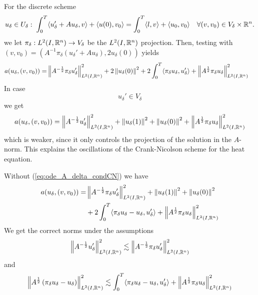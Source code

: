 \documentclass[english,12pt,a4paper]{article}
\begin{document}
%
For the discrete scheme
%
\begin{equation}\label{eq:ode_A_delta}
u_{\delta}\in U_{\delta}:\; \int_0^T \langle u_{\delta}' +Au_{\delta},v\rangle + \langle u(0),v_0\rangle = \int_0^T \langle l,v\rangle + \langle u_0,v_0\rangle \quad\forall (v,v_0)\in V_{\delta}\times\mathbb R^n.
\end{equation}
%
we let $\pi_{\delta}:L^2(I,\mathbb R^n)\to V_{\delta}$ be the $L^2(I,\mathbb R^n)$ projection. Then, testing with $(v,v_0)=(A^{-1}\pi_{\delta}(u_{\delta}'+ Au_{\delta}),2u_{\delta}(0))$ yields
%
\begin{align*}
a(u_{\delta}, (v,v_0)) =& \left\|A^{-\frac12}\pi_{\delta}u_{\delta}'\right\|^2_{L^2(I,\mathbb R^n)} + 2\left\|u_{\delta}(0)\right\|^2 + 2\int_0^T \langle\pi_{\delta}u_{\delta},u_{\delta}'\rangle + \left\|A^{\frac12}\pi_{\delta}u_{\delta}\right\|^2_{L^2(I,\mathbb R^n)}
\end{align*}
%
In case
%
\begin{equation}\label{eq:ode_A_delta_condCN}
u_{\delta}' \in V_{\delta}
\end{equation}
%
we get 
%
\begin{align*}
a(u_{\delta}, (v,v_0)) = \left\|A^{-\frac12}u_{\delta}'\right\|^2_{L^2(I,\mathbb R^n)} + \left\|u_{\delta}(1)\right\|^2 + \left\|u_{\delta}(0)\right\|^2  + \left\|A^{\frac12}\pi_{\delta}u_{\delta}\right\|^2_{L^2(I,\mathbb R^n)}
\end{align*}
%
which is weaker, since it only controls the projection of the solution in the $A$-norm. This explains the oscillations of the Crank-Nicolson scheme for the heat equation.


Without (\ref{eq:ode_A_delta_condCN}) we have
%
\begin{align*}
a(u_{\delta}, (v,v_0)) =& \left\|A^{-\frac12}\pi_{\delta}u_{\delta}'\right\|^2_{L^2(I,\mathbb R^n)} + \left\|u_{\delta}(1)\right\|^2 + \left\|u_{\delta}(0)\right\|^2\\
& + 2\int_0^T \langle\pi_{\delta}u_{\delta}-u_{\delta},u_{\delta}'\rangle + \left\|A^{\frac12}\pi_{\delta}u_{\delta}\right\|^2_{L^2(I,\mathbb R^n)}
\end{align*}
%
We get the correct norms under the assumptions
%
%
\begin{equation}\label{eq:ode_A_delta_stab1}
\left\|A^{-\frac12}u_{\delta}'\right\|^2_{L^2(I,\mathbb R^n)} \lesssim \left\|A^{-\frac12}\pi_{\delta}u_{\delta}'\right\|^2_{L^2(I,\mathbb R^n)}
\end{equation}
%
%
and
%
\begin{equation}\label{eq:ode_A_delta_stab1}
\left\|A^{\frac12}\left(\pi_{\delta}u_{\delta}- u_{\delta}\right)\right\|^2_{L^2(I,\mathbb R^n)} \lesssim \int_0^T \langle\pi_{\delta}u_{\delta}-u_{\delta},u_{\delta}'\rangle + \left\|A^{\frac12}\pi_{\delta}u_{\delta}\right\|^2_{L^2(I,\mathbb R^n)}
\end{equation}
%
\end{document}
